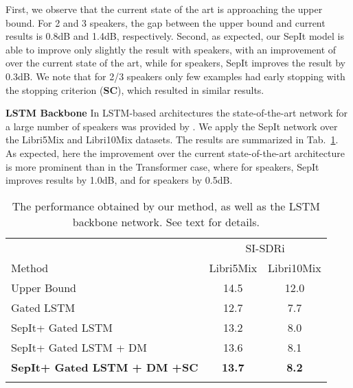 \documentclass[a4paper]{article}
\theoremstyle{plain}
\theoremstyle{definition}
\theoremstyle{remark}
\begin{document}
First, we observe that the current state of the art is approaching the upper bound. For 2 and 3 speakers, the gap between the upper bound and current results is 0.8dB and 1.4dB, respectively. Second, as expected, our SepIt model is able to improve only slightly the result with  speakers, with an improvement of  over the current state of the art, while for  speakers, SepIt improves the result by 0.3dB. We note that for 2/3 speakers only few examples had early stopping with the stopping criterion ({\bf SC}), which resulted in similar results.

\textbf{LSTM Backbone}
In LSTM-based architectures the state-of-the-art network for a large number of speakers was provided by \cite{dovrat2021manyspeakers}. We apply the SepIt network over the Libri5Mix and Libri10Mix datasets. The results are summarized in Tab.~\ref{tab:results_5_10spkrs}. As expected, here the improvement over the current state-of-the-art architecture is more prominent than in the Transformer case, where for  speakers, SepIt improves results by 1.0dB, and for  speakers by 0.5dB.
\begin{table}[h!]
\caption{The performance obtained by our method, as well as the LSTM backbone network. See text for details.}
\label{tab:results_5_10spkrs}

\centering \begin{tabular}{@{}l@{~}cc@{}} 
 \toprule
& \multicolumn{2}{c}{SI-SDRi  {}}\\
 \cmidrule(lr){2-3}Method &  Libri5Mix  & Libri10Mix \\
\midrule
Upper Bound & 14.5 & 12.0\\
Gated LSTM~\cite{dovrat2021manyspeakers} &12.7 & 7.7\\
SepIt+ Gated LSTM &13.2 & 8.0\\
SepIt+ Gated LSTM + DM & 13.6 & 8.1\\
\textbf{SepIt+ Gated LSTM + DM +SC} &{\bf13.7} & {\bf8.2}\\
 \bottomrule
 \vspace{-12.5mm}
\end{tabular}


\end{table}
\end{document}
